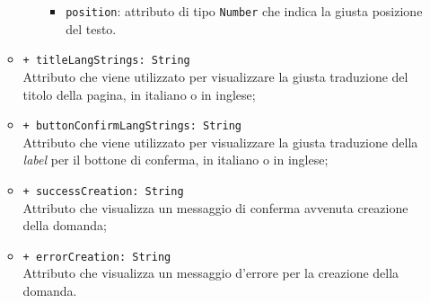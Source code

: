 \begin{itemize}
\begin{itemize}
\begin{itemize}
\begin{itemize}
				\item \texttt{position}: attributo di tipo \texttt{Number} che indica la giusta posizione del testo.
			\end{itemize}
		\end{itemize}	  
		\item \texttt{+ titleLangStrings: String} \\ Attributo che viene utilizzato per visualizzare la giusta traduzione del titolo della pagina, in italiano o in inglese;
		\item \texttt{+ buttonConfirmLangStrings: String} \\ Attributo che viene utilizzato per visualizzare la giusta traduzione della \textit{label} per il bottone di conferma, in italiano o in inglese;
		\item \texttt{+ successCreation: String} \\ Attributo che visualizza un messaggio di conferma avvenuta creazione della domanda;
		\item \texttt{+ errorCreation: String} \\ Attributo che visualizza un messaggio d'errore per la creazione della domanda.
	\end{itemize}
\end{itemize}
